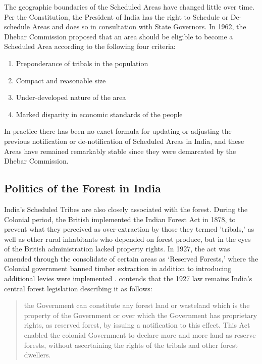\documentclass[12pt,reqno]{article}
\begin{document}
The geographic boundaries of the Scheduled Areas have changed little over time. Per the Constitution, the President of India has the right to Schedule or De-schedule Areas and does so in consultation with State Governors. In 1962, the Dhebar Commission proposed that an area should be eligible to become a Scheduled Area according to the following four criteria:

\begin{enumerate}
\item Preponderance of tribals in the population
\item Compact and reasonable size
\item Under-developed nature of the area
\item Marked disparity in economic standards of the people
\end{enumerate}

\noindent In practice there has been no exact formula for updating or adjusting the previous notification or de-notification of Scheduled Areas in India, and these Areas have remained remarkably stable since they were demarcated by the Dhebar Commission.

\subsection{Politics of the Forest in India}


India's Scheduled Tribes are also closely associated with the forest. During the Colonial period, the British implemented the Indian Forest Act in 1878, to prevent what they  perceived as over-extraction by those they termed 'tribals,' as well as other rural  inhabitants who depended on forest produce, but in the eyes of the British administration lacked property rights. In 1927, the act was amended through the consolidate of certain areas as `Reserved Forests,' where the Colonial government banned timber extraction in addition to introducing additional levies were implemented \parencite{rao_2017-xq}. \textcite[p3]{Patnaik2007-ku} contends that the 1927 law remains India's central forest legislation describing it as follows:

\begin{quote}
the Government  can  constitute  any  forest  land or  wasteland  which  is  the  property of the Government or over which the Government has proprietary rights, as reserved forest, by issuing  a  notification  to  this  effect.  This  Act  enabled the colonial  Government  to  declare  more  and  more land as reserve forests, without ascertaining the rights of the tribals and other forest dwellers.
\end{quote}
\end{document}
